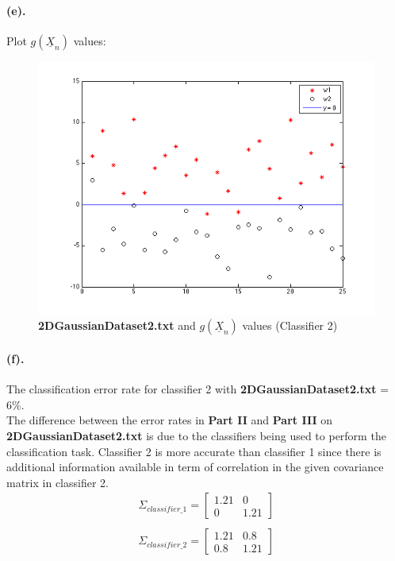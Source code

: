\documentclass[a4paper]{article}
\begin{document}
\paragraph{(e).} Plot $g(\underline{X}_{n})$ values: \\
\begin{figure}[H]
  \centering
    \includegraphics[scale=.6]{images/3_e.png}
  \caption{\textbf{2DGaussianDataset2.txt} and $g(\underline{X}_{n})$ values (Classifier 2)}
\end{figure}

\paragraph{(f).} The classification error rate for classifier 2 with \textbf{2DGaussianDataset2.txt} = 6\%. \\

The difference between the error rates in \textbf{Part II} and \textbf{Part III} on \textbf{2DGaussianDataset2.txt} is due to the classifiers being used to perform the classification task. Classifier 2 is more accurate than classifier 1 since there is additional information available in term of correlation in the given covariance matrix in classifier 2. \\

\begin{align*}
\Sigma_{classifier\_1} = 
	\begin{bmatrix}
		1.21 & 0 \\
		0 & 1.21
	\end{bmatrix} \\ \\
\Sigma_{classifier\_2} = 
	\begin{bmatrix}
		1.21 & 0.8 \\
		0.8 & 1.21
	\end{bmatrix}
\end{align*}
\end{document}
